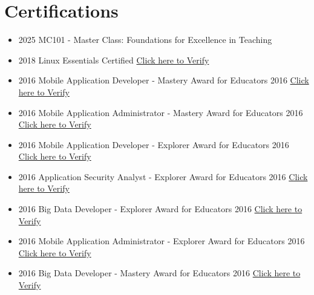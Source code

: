 \documentclass[11pt,a4paper]{article}
\begin{document}
\section*{ Certifications}
\begin{itemize}[leftmargin=*,noitemsep,topsep=0pt]
  \item {} 2025 MC101 - Master Class: Foundations for Excellence in Teaching
  \item {} 2018 Linux Essentials Certified \href{https://cs.lpi.org/caf/Xamman/certification/verify/LPI000399745/83dqrg3zhh}{ Click here to Verify}
  \item {} 2016 Mobile Application Developer - Mastery Award for Educators 2016 \href{https://www.credly.com/badges/8da480bb-7feb-4a3a-8ea1-8441ff361ce0/facebook?fbclid=IwAR1Klzr9AyTlkKR6p_g4UsQrXewCazabSdmG6XzWmzS43nvlcWtv2i4a9ZA}{ Click here to Verify}
  \item {} 2016 Mobile Application Administrator - Mastery Award for Educators 2016 \href{https://www.credly.com/badges/d485df4f-15d3-495e-b35c-865173dbd0d5/facebook?fbclid=IwAR0n1puJKGQZFGzyjBZoapOgfqtdhPwkm9fEaIlyvraHZFXWgrpywpAOA54}{ Click here to Verify}
  \item {} 2016 Mobile Application Developer - Explorer Award for Educators 2016 \href{https://www.credly.com/badges/e77e1135-2389-4fa8-bd6b-01646fbbfdf4/facebook?fbclid=IwAR3sabR8gXHcXVaoS6ssTBjb7lAGt9eqo-hkmjWSib4aNYuxZHeh_1eUA3Y}{ Click here to Verify}
  \item {} 2016 Application Security Analyst - Explorer Award for Educators 2016 \href{https://www.credly.com/badges/069d74a0-24eb-4b18-8f2e-a93dbd4b903e/facebook?fbclid=IwAR2mIeao3Ogy5071ANBK_b52upH6AQArYVtmMOffENm_6QjVcHNTJHvdNMY}{ Click here to Verify}
  \item {} 2016 Big Data Developer - Explorer Award for Educators 2016 \href{https://www.credly.com/badges/4fc05882-a629-498d-931c-9841ff8d8d26/facebook?fbclid=IwAR3fWlgpPKxiIvnZUqCqj_o0Wb9zoZj6ZmcEBK_1RKdnJMPVXbr9_bHrO3A}{ Click here to Verify}
  \item {} 2016 Mobile Application Administrator - Explorer Award for Educators 2016 \href{https://www.credly.com/badges/c6a3b02f-a5c8-4fb0-bce1-16f299ea6c15/facebook?fbclid=IwAR3AxESJzG5Nt0Q5d8TAOpzUMFJEvVUhAo4mvk0q0h8SCk_pKr2cSZ4eU_8}{ Click here to Verify}
  \item {} 2016 Big Data Developer - Mastery Award for Educators 2016 \href{https://www.credly.com/badges/a7a27275-c356-48f8-85bf-e72881371430/facebook?fbclid=IwAR2-_Mg6zXyOsJOYBUCEnE6DeLJr02poAcEWTdzHP18WEz19MTpyWW3Qmb0}{ Click here to Verify}
\end{itemize}
\end{document}
